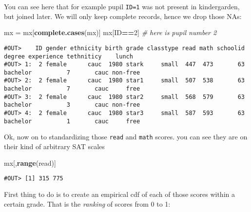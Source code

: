 \documentclass[]{book}
\newenvironment{Shaded}{\begin{snugshade}}{\end{snugshade}}
\newcommand{\CommentTok}[1]{\textcolor[rgb]{0.56,0.35,0.01}{\textit{#1}}}
\newcommand{\DecValTok}[1]{\textcolor[rgb]{0.00,0.00,0.81}{#1}}
\newcommand{\KeywordTok}[1]{\textcolor[rgb]{0.13,0.29,0.53}{\textbf{#1}}}
\newcommand{\NormalTok}[1]{#1}
\newcommand{\OperatorTok}[1]{\textcolor[rgb]{0.81,0.36,0.00}{\textbf{#1}}}
\newcommand{\StringTok}[1]{\textcolor[rgb]{0.31,0.60,0.02}{#1}}
\begin{document}
You can see here that for example pupil \texttt{ID=1} was not present in kindergarden, but joined later. We will only keep complete records, hence we drop those NAs:

\begin{Shaded}
\begin{Highlighting}[]
\NormalTok{mx =}\StringTok{ }\NormalTok{mx[}\KeywordTok{complete.cases}\NormalTok{(mx)]}
\NormalTok{mx[ID}\OperatorTok{==}\DecValTok{2}\NormalTok{]  }\CommentTok{# here is pupil number 2}
\end{Highlighting}
\end{Shaded}

\begin{verbatim}
#OUT>    ID gender ethnicity birth grade classtype read math schoolid   degree experience tethniticy    lunch
#OUT> 1:  2 female      cauc  1980 stark     small  447  473       63 bachelor          7       cauc non-free
#OUT> 2:  2 female      cauc  1980 star1     small  507  538       63 bachelor          7       cauc     free
#OUT> 3:  2 female      cauc  1980 star2     small  568  579       63 bachelor          3       cauc non-free
#OUT> 4:  2 female      cauc  1980 star3     small  587  593       63 bachelor          1       cauc     free
\end{verbatim}

Ok, now on to standardizing those \texttt{read} and \texttt{math} scores. you can see they are on their kind of arbitrary SAT scales

\begin{Shaded}
\begin{Highlighting}[]
\NormalTok{mx[,}\KeywordTok{range}\NormalTok{(read)]}
\end{Highlighting}
\end{Shaded}

\begin{verbatim}
#OUT> [1] 315 775
\end{verbatim}

First thing to do is to create an empirical cdf of each of those scores within a certain grade. That is the \emph{ranking} of scores from 0 to 1:
\end{document}
